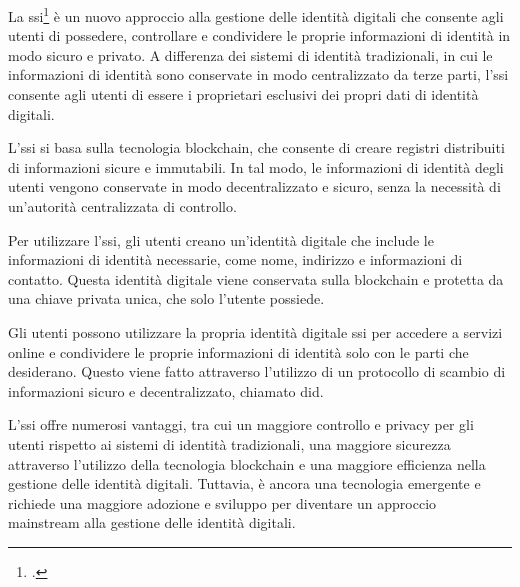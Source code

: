 La \acrfull{ssi}\footcite{site:ssi} è un nuovo approccio alla gestione delle identità digitali che consente agli utenti di possedere, controllare e condividere le proprie informazioni di identità in modo sicuro e privato. A differenza dei sistemi di identità tradizionali, in cui le informazioni di identità sono conservate in modo centralizzato da terze parti, l'\acrshort{ssi} consente agli utenti di essere i proprietari esclusivi dei propri dati di identità digitali.

L'\acrshort{ssi} si basa sulla tecnologia blockchain, che consente di creare registri distribuiti di informazioni sicure e immutabili. In tal modo, le informazioni di identità degli utenti vengono conservate in modo decentralizzato e sicuro, senza la necessità di un'autorità centralizzata di controllo.

Per utilizzare l'\acrshort{ssi}, gli utenti creano un'identità digitale che include le informazioni di identità necessarie, come nome, indirizzo e informazioni di contatto. Questa identità digitale viene conservata sulla blockchain e protetta da una chiave privata unica, che solo l'utente possiede.

Gli utenti possono utilizzare la propria identità digitale \acrshort{ssi} per accedere a servizi online e condividere le proprie informazioni di identità solo con le parti che desiderano. Questo viene fatto attraverso l'utilizzo di un protocollo di scambio di informazioni sicuro e decentralizzato, chiamato \acrfull{did}.

L'\acrshort{ssi} offre numerosi vantaggi, tra cui un maggiore controllo e privacy per gli utenti rispetto ai sistemi di identità tradizionali, una maggiore sicurezza attraverso l'utilizzo della tecnologia blockchain e una maggiore efficienza nella gestione delle identità digitali. Tuttavia, è ancora una tecnologia emergente e richiede una maggiore adozione e sviluppo per diventare un approccio mainstream alla gestione delle identità digitali.
